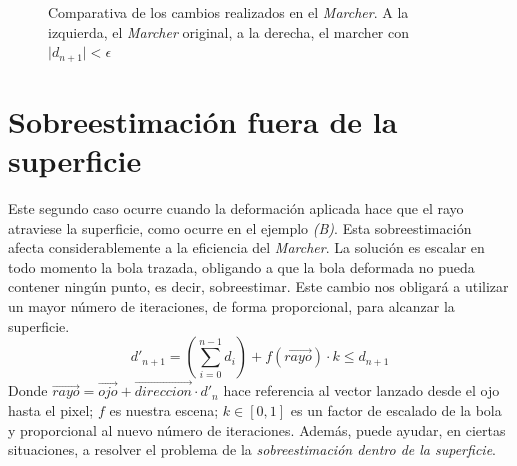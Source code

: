 \begin{figure}[H]
  \centering
  \captionsetup{justification=centering}%
  \hfill
  \caption{Comparativa de los cambios realizados en el \textit{Marcher}. A la izquierda, el \textit{Marcher} original, a la derecha, el marcher con \(\vert d_{n+1}\vert < \epsilon\)}
\end{figure}
\section{Sobreestimación fuera de la superficie}
Este segundo caso ocurre cuando la deformación aplicada hace que el rayo atraviese la superficie, como ocurre en el ejemplo \textit{(B)}.
Esta sobreestimación afecta considerablemente a la eficiencia del \textit{Marcher}. La solución es escalar en todo momento la bola trazada, obligando a que la bola deformada no pueda contener ningún punto, es decir, sobreestimar. Este cambio nos obligará a utilizar un mayor número de iteraciones, de forma proporcional, para alcanzar la superficie.
\[d'_{n+1}=\left(\sum^{n-1}_{i=0} d_{i}\right) + f(\Vec{rayo})\cdot k \leq d_{n+1}\]
Donde \(\Vec{rayo}=\Vec{ojo}+\Vec{direccion}\cdot d'_n\) hace referencia al vector lanzado desde el ojo hasta el pixel; \(f\) es nuestra escena; \(k\in[0,1]\) es un factor de escalado de la bola y proporcional al nuevo número de iteraciones. Además, puede ayudar, en ciertas situaciones, a resolver el problema de la \textit{sobreestimación dentro de la superficie}.

